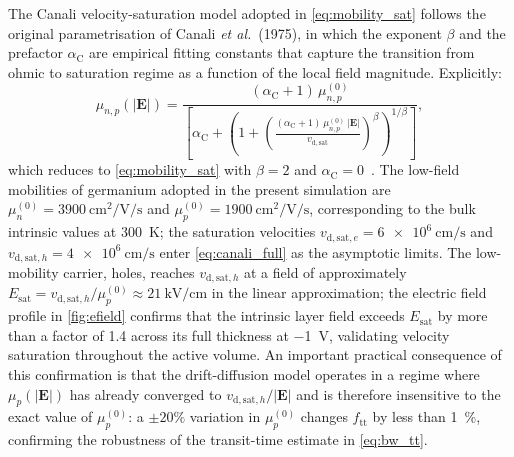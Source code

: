 The Canali velocity-saturation model adopted in \cref{eq:mobility_sat}
follows the original parametrisation of Canali \textit{et al.}~(1975), in
which the exponent $\beta$ and the prefactor $\alpha_{\mathrm{C}}$ are
empirical fitting constants that capture the transition from ohmic to
saturation regime as a function of the local field magnitude. Explicitly:
\begin{equation}
    \mu_{n,p}(|\mathbf{E}|)
    = \frac{(\alpha_{\mathrm{C}}+1)\,\mu_{n,p}^{(0)}}
      {\left[\alpha_{\mathrm{C}}
        + \!\left(1 + \!\left(\frac{(\alpha_{\mathrm{C}}+1)\,
          \mu_{n,p}^{(0)}\,|\mathbf{E}|}{v_{\mathrm{d,sat}}}\right)^{\!\beta}
        \right)^{1/\beta}\right]},
    \label{eq:canali_full}
\end{equation}
which reduces to \cref{eq:mobility_sat} with $\beta = 2$ and $\alpha_{\mathrm{C}}
= 0$~\cite{Alasio2024}. The low-field mobilities of germanium adopted in the
present simulation are $\mu_n^{(0)} = \SI{3900}{\centi\metre\squared\per\volt
\per\second}$ and $\mu_p^{(0)} = \SI{1900}{\centi\metre\squared\per\volt
\per\second}$, corresponding to the bulk intrinsic values at \SI{300}{\kelvin};
the saturation velocities $v_{\mathrm{d,sat},e} = \SI{6e6}{\centi\metre\per
\second}$ and $v_{\mathrm{d,sat},h} = \SI{4e6}{\centi\metre\per\second}$
enter \cref{eq:canali_full} as the asymptotic limits. The low-mobility carrier,
holes, reaches $v_{\mathrm{d,sat},h}$ at a field of approximately
$E_{\mathrm{sat}} = v_{\mathrm{d,sat},h}/\mu_p^{(0)} \approx \SI{21}{\kilo
\volt\per\centi\metre}$ in the linear approximation; the electric field profile
in \cref{fig:efield} confirms that the intrinsic layer field exceeds
$E_{\mathrm{sat}}$ by more than a factor of 1.4 across its full thickness at
\SI{-1}{\volt}, validating velocity saturation throughout the active volume.
An important practical consequence of this confirmation is that the
drift-diffusion model operates in a regime where $\mu_p(|\mathbf{E}|)$ has
already converged to $v_{\mathrm{d,sat},h}/|\mathbf{E}|$ and is therefore
insensitive to the exact value of $\mu_p^{(0)}$: a $\pm 20\%$ variation in
$\mu_p^{(0)}$ changes $f_{\mathrm{tt}}$ by less than \SI{1}{\percent},
confirming the robustness of the transit-time estimate in \cref{eq:bw_tt}.




